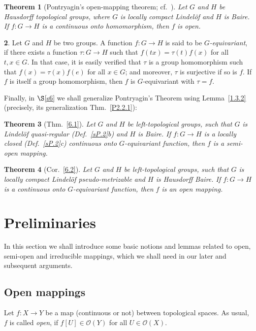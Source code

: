 \documentclass[12pt,final,3p,times]{elsarticle}
\newtheorem{sthm}{Theorem}[subsection]
\theoremstyle{definition}
\newtheorem{sse}[sthm]{}
\numberwithin{equation}{section}
\begin{document}
\begin{sthm}[{Pontryagin's open-mapping theorem; cf.~\cite[Thm.~5.29]{HR63}}]\label{1.4.1}
  Let $G$ and $H$ be Hausdorff topological groups, where $G$ is locally compact Lindel\"{o}f and $H$ is Baire. If $f\colon G\rightarrow H$ is a continuous onto homomorphism, then $f$ is open.  
\end{sthm} 

\begin{sse}\label{1.4.2}
    Let $G$ and $H$ be two groups. A function $f\colon G\rightarrow H$ is said to be \textit{$G$-equivariant}, if there exists a function $\tau\colon G\rightarrow H$ such that $f(tx)=\tau(t)f(x)$ for all $t,x\in G$. In that case, it is easily verified that $\tau$ is a group homomorphism such that $f(x)=\tau(x)f(e)$ for all $x\in G$; and moreover, $\tau$ is surjective if so is $f$. If $f$ is itself a group homomorphism, then $f$ is $G$-equivariant with $\tau=f$.
\end{sse}

Finally, in $\S$\ref{s6} we shall generalize Pontryagin's Theorem using Lemma~\ref{1.3.2} (precisely, its generalization Thm.~\ref{P2.2.1}):

\begin{sthm}[Thm.~\ref{6.1}]\label{1.4.3}
Let $G$ and $H$ be left-topological groups, such that $G$ is Lindel\"{o}f quasi-regular (Def.~\ref{sP.2}b) and $H$ is Baire. If $f\colon G\rightarrow H$ is a locally closed (Def.~\ref{sP.2}c) continuous onto $G$-equivariant function, then $f$ is a semi-open mapping.
\end{sthm}

\begin{sthm}[Cor.~\ref{6.2}]\label{1.4.4}
Let $G$ and $H$ be left-topological groups, such that $G$ is locally compact Lindel\"{o}f pseudo-metrizable and $H$ is Hausdorff Baire. If $f\colon G\rightarrow H$ is a continuous onto $G$-equivariant function, then $f$ is an open mapping.
\end{sthm}
\section{Preliminaries}\label{sP}%
In this section we shall introduce some basic notions and lemmas related to open, semi-open and irreducible mappings, which we shall need in our later and subsequent arguments.

\subsection{Open mappings}\label{sP.1}
Let $f\colon X\rightarrow Y$ be a map (continuous or not) between topological spaces. As usual, $f$ is called \textit{open}, if $f[U]\in\mathscr{O}(Y)$ for all $U\in\mathscr{O}(X)$.
\end{document}

